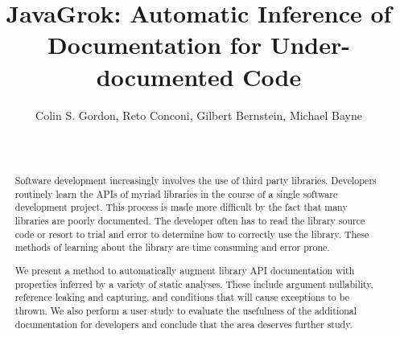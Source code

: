 \documentclass[letterpaper]{acm_proc_article-sp}
\begin{document}
\lstset{
	language=Java,
	numbers=left,
	tabsize=2,
	showstringspaces=false,
	basicstyle=\ttfamily\small
}

\title{JavaGrok: Automatic Inference of Documentation for Under-documented Code}

\author{
\alignauthor
Colin S. Gordon, Reto Conconi, Gilbert Bernstein, Michael Bayne\\
       \\
       \\
}

\maketitle
\begin{abstract}
Software development increasingly involves the use of third party
libraries. Developers routinely learn the APIs of myriad
libraries in the course of a single software development project. This process
is made more difficult by the fact that many libraries are poorly documented.
The developer often has to read the library source code or resort to trial and
error to determine how to correctly use the library. These methods of learning
about the library are time consuming and error prone.

We present a method to automatically augment library API documentation with
properties inferred by a variety of static analyses. These include argument
nullability, reference leaking and capturing, and conditions that will cause exceptions
to be thrown.
We also perform a user study to
evaluate the usefulness of the additional documentation for developers and
conclude that the area deserves further study.
\end{abstract}



\end{document}
